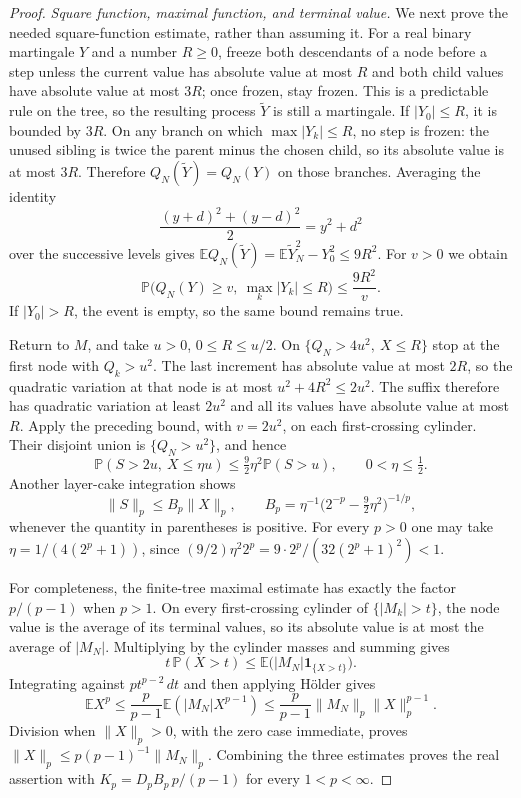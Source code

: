\documentclass[11pt]{article}
\numberwithin{equation}{section}
\theoremstyle{remark}
\theoremstyle{definition}
\begin{document}
\begin{proof}
\emph{Square function, maximal function, and terminal value.}
We next prove the needed square-function estimate, rather than
assuming it. For a real binary martingale $Y$ and a number $R\ge0$,
freeze both descendants of a node before a step unless the current
value has absolute value at most $R$ and both child values have
absolute value at most $3R$; once frozen, stay frozen. This is a
predictable rule on the tree, so the resulting process $\widetilde Y$
is still a martingale. If $|Y_0|\le R$, it is bounded by $3R$.
On any branch on which $\max|Y_k|\le R$, no step is frozen:
the unused sibling is twice the parent minus the chosen child,
so its absolute value is at most $3R$. Therefore
$Q_N(\widetilde Y)=Q_N(Y)$ on those branches. Averaging the identity
\[
 \frac{(y+d)^2+(y-d)^2}{2}=y^2+d^2
\]
over the successive levels gives
$\mathbb E Q_N(\widetilde Y)
 =\mathbb E\widetilde Y_N^2-Y_0^2\le9R^2$.
For $v>0$ we obtain
\[
 \mathbb P\bigl(Q_N(Y)\ge v,\ \max_k|Y_k|\le R\bigr)
 \le\frac{9R^2}{v}.
\]
If $|Y_0|>R$, the event is empty, so the same bound remains true.

Return to $M$, and take $u>0$, $0\le R\le u/2$. On
$\{Q_N>4u^2,\ X\le R\}$ stop at the first node with $Q_k>u^2$.
The last increment has absolute value at most $2R$, so the
quadratic variation at that node is at most
$u^2+4R^2\le2u^2$. The suffix therefore has quadratic variation
at least $2u^2$ and all its values have absolute value at most $R$.
Apply the preceding bound, with $v=2u^2$, on each first-crossing
cylinder. Their disjoint union is $\{Q_N>u^2\}$, and hence
\[
 \mathbb P(S>2u,\ X\le\eta u)
 \le\tfrac92\eta^2\mathbb P(S>u),\qquad 0<\eta\le\tfrac12.
\]
Another layer-cake integration shows
\[
 \|S\|_p\le B_p\|X\|_p,\qquad
 B_p=\eta^{-1}\bigl(2^{-p}-\tfrac92\eta^2\bigr)^{-1/p},
\]
whenever the quantity in parentheses is positive. For every $p>0$
one may take $\eta=1/(4(2^p+1))$, since
$(9/2)\eta^2 2^p=9\cdot2^p/(32(2^p+1)^2)<1$.

For completeness, the finite-tree maximal estimate has exactly the
factor $p/(p-1)$ when $p>1$. On every first-crossing cylinder of
$\{|M_k|>t\}$, the node value is the average of its terminal
values, so its absolute value is at most the average of $|M_N|$.
Multiplying by the cylinder masses and summing gives
\[
 t\,\mathbb P(X>t)\le\mathbb E\bigl(|M_N|\mathbf1_{\{X>t\}}\bigr).
\]
Integrating against $pt^{p-2}\,dt$ and then applying H\"older gives
\[
 \mathbb E X^p\le\frac p{p-1}\mathbb E(|M_N|X^{p-1})
 \le\frac p{p-1}\|M_N\|_p\|X\|_p^{p-1}.
\]
Division when $\|X\|_p>0$, with the zero case immediate, proves
$\|X\|_p\le p(p-1)^{-1}\|M_N\|_p$. Combining the three estimates
proves the real assertion with
$K_p=D_pB_p\,p/(p-1)$ for every $1<p<\infty$.


\end{proof}
\end{document}
